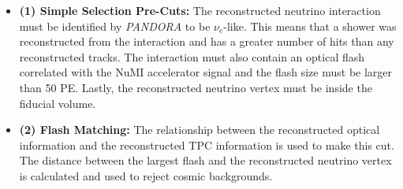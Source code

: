 \FloatBarrier
\begin{itemize}

    
    
    
    \item \textbf{(1) Simple Selection Pre-Cuts:} The reconstructed neutrino interaction must be identified by \textit{PANDORA} to be $\nu_e$-like. This means that a shower was reconstructed from the interaction and has a greater number of hits than any reconstructed tracks. The interaction must also contain an optical flash correlated with the NuMI accelerator signal and the flash size must be larger than 50 PE. Lastly, the reconstructed neutrino vertex must be inside the fiducial volume.
    
    
    \item \textbf{(2) Flash Matching:} The relationship between the reconstructed optical information and the reconstructed TPC information is used to make this cut. The distance between the largest flash and the reconstructed neutrino vertex is calculated and used to reject cosmic backgrounds. 
        
    
    

\end{itemize}
